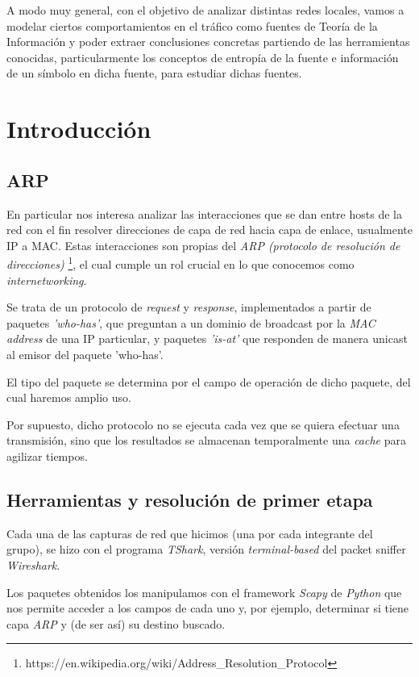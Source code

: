 A modo muy general, con el objetivo de analizar distintas redes locales, vamos a modelar ciertos comportamientos en el tráfico como fuentes de Teoría de la Información y poder extraer conclusiones concretas partiendo de las herramientas conocidas, particularmente los conceptos de entropía de la fuente e información de un símbolo en dicha fuente, para estudiar dichas fuentes.
\section{Introducción}
\subsection{ARP}
En particular nos interesa analizar las interacciones que se dan entre hosts de la red con el fin resolver direcciones de capa de red hacia capa de enlace, usualmente IP a MAC. Estas interacciones son propias del \emph{ARP (protocolo de resolución de direcciones)} \footnote{https://en.wikipedia.org/wiki/Address_Resolution_Protocol}, el cual cumple un rol crucial en lo que conocemos como \emph{internetworking}.

Se trata de un protocolo de \emph{request} y \emph{response}, implementados a partir de paquetes \emph{'who-has'}, que preguntan a un dominio de broadcast por la \emph{MAC address} de una IP particular, y paquetes \emph{'is-at'} que responden de manera unicast al emisor del paquete 'who-has'.

El tipo del paquete se determina por el campo de operación de dicho paquete, del cual haremos amplio uso.

Por supuesto, dicho protocolo no se ejecuta cada vez que se quiera efectuar una transmisión, sino que los resultados se almacenan temporalmente una \emph{cache} para agilizar tiempos.

\subsection{Herramientas y resolución de primer etapa}
Cada una de las capturas de red que hicimos (una por cada integrante del grupo), se hizo con el programa \emph{TShark}, versión \emph{terminal-based} del packet sniffer \emph{Wireshark}.

Los paquetes obtenidos los manipulamos con el framework \emph{Scapy} de \emph{Python} que nos permite acceder a los campos de cada uno y, por ejemplo, determinar si tiene capa \emph{ARP} y (de ser así) su destino buscado.

